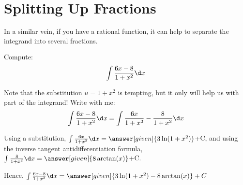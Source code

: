 \documentclass[nooutcomes]{ximera}
\begin{document}
\begin{comment}
Let's see one more example with trigonometric functions:

\begin{example}
  Compute:
  \[
  \int \frac{\sin(x) + \cos^2(x)}{\csc(x)} \d x
  \]
  \begin{explanation}
    To start, let's express everything in terms of sine and cosine:
    \begin{align*}
      \int \frac{\sin(x) + \cos^2(x)}{\csc(x)} \d x &= \int \frac{\sin(x) + \cos^2(x)}{\frac{1}{\sin(x)}} \d x\\
      &= \int \sin^2(x) + \sin(x)\cos^2(x) \d x
    \end{align*}
    if we use our power-reduction formula above, we find
    \[
    \int \answer[given]{\frac{1-\cos(2x)}{2}}+ \sin(x)\cos^2(x) \d x
    \]
    Splitting this integral up we now have
    \begin{align*}
      \int &\answer[given]{\frac{1}{2}} \d x - \int \frac{\cos(2x)}{2}\d x + \int \sin(x)\cos^2(x) \d x  \\
      &= \answer[given]{\frac{x}{2} - \frac{\sin(2x)}{4} - \frac{\cos^3(x)}{3}}+C.
    \end{align*}
  \end{explanation}
\end{example}
\end{comment}

\section{Splitting Up Fractions}

In a similar vein, if you have a rational function, it can help to separate the
integrand into several fractions.

\begin{example}
  Compute:
  \[
  \int \frac{6x-8}{1+x^2}\d x
  \]
 
  \begin{explanation}
    Note that the substitution $u= 1+x^2$ is tempting, but it only will help us with part of the integrand!  Write with me:
    \[ \int \frac{6x-8}{1+x^2}\d x = \int \frac{6x}{1+x^2}-\frac{8}{1+x^2} \d x \]
      
Using a substitution, $ \int \frac{6x}{1+x^2}\d x = \answer[given]{3 \ln(1+x^2)}$+C, and using the inverse tangent antidifferentiation formula, $ \int \frac{8}{1+x^2}\d x = \answer[given]{8 \arctan(x)}$+C.

Hence, $\int \frac{6x-8}{1+x^2}\d x =  \answer[given]{3 \ln(1+x^2)- 8 \arctan(x)}+C$
  \end{explanation}
\end{example}
\end{document}
